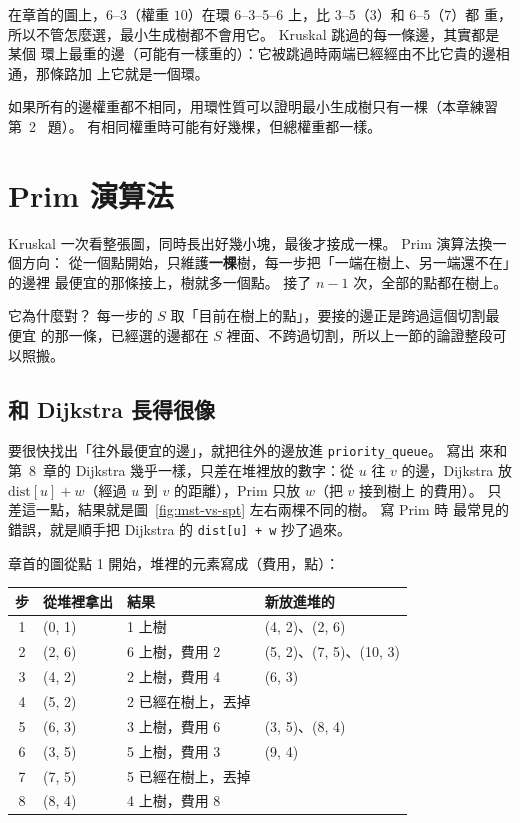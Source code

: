 在章首的圖上，6--3（權重 $10$）在環 6--3--5--6 上，比 3--5（$3$）和 6--5（$7$）都
重，所以不管怎麼選，最小生成樹都不會用它。 Kruskal 跳過的每一條邊，其實都是某個
環上最重的邊（可能有一樣重的）：它被跳過時兩端已經經由不比它貴的邊相通，那條路加
上它就是一個環。

如果所有的邊權重都不相同，用環性質可以證明最小生成樹只有一棵（本章練習第~2~
題）。 有相同權重時可能有好幾棵，但總權重都一樣。

\section{Prim 演算法}
\label{sec:prim}

Kruskal 一次看整張圖，同時長出好幾小塊，最後才接成一棵。 Prim 演算法換一個方向：
從一個點開始，只維護\textbf{一棵}樹，每一步把「一端在樹上、另一端還不在」的邊裡
最便宜的那條接上，樹就多一個點。 接了 $n - 1$ 次，全部的點都在樹上。

它為什麼對？ 每一步的 $S$ 取「目前在樹上的點」，要接的邊正是跨過這個切割最便宜
的那一條，已經選的邊都在 $S$ 裡面、不跨過切割，所以上一節的論證整段可以照搬。

\subsection{和 Dijkstra 長得很像}

要很快找出「往外最便宜的邊」，就把往外的邊放進 \texttt{priority\_queue}。 寫出
來和第~8~章的 Dijkstra 幾乎一樣，只差在堆裡放的數字：從 $u$ 往 $v$ 的邊，Dijkstra
放 $\mathrm{dist}[u] + w$（經過 $u$ 到 $v$ 的距離），Prim 只放 $w$（把 $v$ 接到樹上
的費用）。 只差這一點，結果就是圖~\ref{fig:mst-vs-spt} 左右兩棵不同的樹。 寫 Prim 時
最常見的錯誤，就是順手把 Dijkstra 的 \texttt{dist[u] + w} 抄了過來。

章首的圖從點 1 開始，堆裡的元素寫成（費用，點）：

\begin{center}
\begin{tabular}{clll}
\toprule
步 & 從堆裡拿出 & 結果 & 新放進堆的 \\
\midrule
1 & (0, 1) & 1 上樹 & (4, 2)、(2, 6) \\
2 & (2, 6) & 6 上樹，費用 2 & (5, 2)、(7, 5)、(10, 3) \\
3 & (4, 2) & 2 上樹，費用 4 & (6, 3) \\
4 & (5, 2) & 2 已經在樹上，丟掉 & \\
5 & (6, 3) & 3 上樹，費用 6 & (3, 5)、(8, 4) \\
6 & (3, 5) & 5 上樹，費用 3 & (9, 4) \\
7 & (7, 5) & 5 已經在樹上，丟掉 & \\
8 & (8, 4) & 4 上樹，費用 8 & \\
\bottomrule
\end{tabular}
\end{center}

